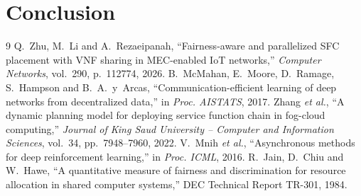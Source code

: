\documentclass[11pt,a4paper]{article}
\begin{document}
\section*{Conclusion}



\begin{thebibliography}{9}
 Q.~Zhu, M.~Li and A.~Rezaeipanah, ``Fairness-aware and
parallelized SFC placement with VNF sharing in MEC-enabled IoT networks,''
\emph{Computer Networks}, vol.~290, p.~112774, 2026.
 B.~McMahan, E.~Moore, D.~Ramage, S.~Hampson and
B.~A.~y~Arcas, ``Communication-efficient learning of deep networks from
decentralized data,'' in \emph{Proc. AISTATS}, 2017.
 Zhang \emph{et al.}, ``A dynamic planning model for deploying
service function chain in fog-cloud computing,'' \emph{Journal of King Saud
University -- Computer and Information Sciences}, vol.~34, pp.~7948--7960, 2022.
 V.~Mnih \emph{et al.}, ``Asynchronous methods for deep
reinforcement learning,'' in \emph{Proc. ICML}, 2016.
 R.~Jain, D.~Chiu and W.~Hawe, ``A quantitative measure of
fairness and discrimination for resource allocation in shared computer
systems,'' DEC Technical Report TR-301, 1984.
\end{thebibliography}
\end{document}
